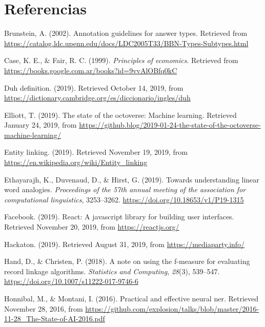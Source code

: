 \documentclass[12pt,a4paper,]{scrartcl}
\begin{document}
\newpage

\hypertarget{referencias}{%
\section*{Referencias}\label{referencias}}

\hypertarget{refs}{}
\leavevmode\hypertarget{ref-brunstein2002}{}%
Brunstein, A. (2002). Annotation guidelines for answer types. Retrieved from \url{https://catalog.ldc.upenn.edu/docs/LDC2005T33/BBN-Types-Subtypes.html}

\leavevmode\hypertarget{ref-lawOfDiminishingReturns}{}%
Case, K. E., \& Fair, R. C. (1999). \emph{Principles of economics}. Retrieved from \url{https://books.google.com.ar/books?id=9vvAlOBfq0kC}

\leavevmode\hypertarget{ref-cambridge_duh}{}%
Duh definition. (2019). Retrieved October 14, 2019, from \url{https://dictionary.cambridge.org/es/diccionario/ingles/duh}

\leavevmode\hypertarget{ref-github_machine_learning}{}%
Elliott, T. (2019). The state of the octoverse: Machine learning. Retrieved January 24, 2019, from \url{https://github.blog/2019-01-24-the-state-of-the-octoverse-machine-learning/}

\leavevmode\hypertarget{ref-wiki_nel}{}%
Entity linking. (2019). Retrieved November 19, 2019, from \url{https://en.wikipedia.org/wiki/Entity_linking}

\leavevmode\hypertarget{ref-ethayarajh-etal-2019-towards}{}%
Ethayarajh, K., Duvenaud, D., \& Hirst, G. (2019). Towards understanding linear word analogies. \emph{Proceedings of the 57th annual meeting of the association for computational linguistics}, 3253--3262. \url{https://doi.org/10.18653/v1/P19-1315}

\leavevmode\hypertarget{ref-react}{}%
Facebook. (2019). React: A javascript library for building user interfaces. Retrieved November 20, 2019, from \url{https://reactjs.org/}

\leavevmode\hypertarget{ref-hackaton2019}{}%
Hackaton. (2019). Retrieved August 31, 2019, from \url{https://mediaparty.info/}

\leavevmode\hypertarget{ref-pub_1084928040}{}%
Hand, D., \& Christen, P. (2018). A note on using the f-measure for evaluating record linkage algorithms. \emph{Statistics and Computing}, \emph{28}(3), 539--547. \url{https://doi.org/10.1007/s11222-017-9746-6}

\leavevmode\hypertarget{ref-montani_AI}{}%
Honnibal, M., \& Montani, I. (2016). Practical and effective neural ner. Retrieved November 28, 2016, from \url{https://github.com/explosion/talks/blob/master/2016-11-28_The-State-of-AI-2016.pdf}
\end{document}
